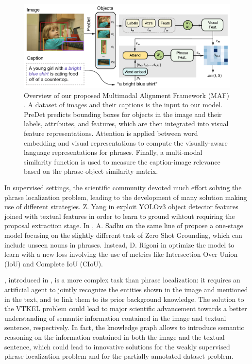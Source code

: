 \begin{figure}
  \centering
  \includegraphics[width=.8\textwidth]{figures/maf-model.png}
  \caption[Multimodal Alignment Framework model overview]{Overview
  of our proposed Multimodal Alignment Framework (MAF)
  \cite{wang2020maf}. A dataset of images and their captions is the
  input to our model. PreDet predicts bounding boxes for objects in
  the image and their labels, attributes, and features, which are
  then integrated into visual feature representations. Attention is
  applied between word embedding and visual representations to
  compute the visually-aware language representations for phrases.
  Finally, a multi-modal similarity function is used to measure the
  caption-image relevance based on the phrase-object similarity
  matrix.}
  \label{fig:maf-model}
\end{figure}


In supervised settings, the scientific community devoted much effort
solving the phrase localization problem, leading to the development of
many solution making use of different strategies. 
Z. Yang \etal{} in  exploit YOLOv3 object detector features joined with textual
features in order to learn to ground wihtout requiring the proposal
extraction stage. In , A. Sadhu \etal{}
on the same line of  propose
a one-stage model focusing on the slightly different task of Zero Shot
Grounding, which can include unseen nouns in phrases. Instead, D.
Rigoni \etal{} in  optimize the model to
learn with a new loss involving the use of metrics like Intersection
Over Union (IoU) and Complete IoU (CIoU).

, introduced in
, is a more complex task than phrase
localization: it requires an artificial agent to jointly recognize the
entities shown in the image and mentioned in the text, and to link
them to its prior background knowledge. The solution to the VTKEL
problem could lead to major scientific advancement towards a better
understanding of semantic information contained in the image and
textual sentence, respectively. In fact, the knowledge graph allows to
introduce semantic reasoning on the information contained in both the
image and the textual sentence, which could lead to innovative
solutions for the weakly supervised phrase localization problem and
for the partially annotated dataset problem.

